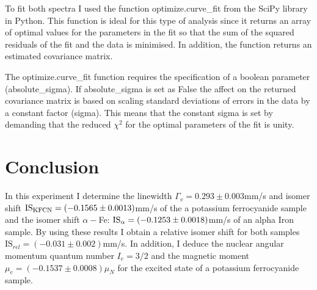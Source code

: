 \documentclass[a4paper, twocolumn]{article}
\begin{document}
To fit both spectra I used the function optimize.curve\_fit from the SciPy library in Python.
This function is ideal for this type of analysis since it returns an array of optimal values for the parameters in the fit so that the sum of the squared residuals of the fit and the data is minimised\cite{15}. In addition, the function returns an estimated covariance matrix.

The optimize.curve\_fit function requires the specification of a boolean parameter (absolute\_sigma). If absolute\_sigma is set as False the affect on the returned covariance matrix is based on scaling standard deviations of errors in the data by a constant factor (sigma). This means that the constant sigma is set by demanding that the reduced $\chi^2$ for the optimal parameters of the fit is unity\cite{15}.

\section{Conclusion}
In this experiment I determine the linewidth $\Gamma_v = 0.293\pm0.003$mm/s and isomer shift $\textrm{IS}_{\rm KFCN} = (-0.1565\pm0.0013)$mm/s of the a potassium ferrocyanide sample and the isomer shift $\alpha-$Fe: $\textrm{IS}_{\rm \alpha} = (-0.1253\pm0.0018)$mm/s of an alpha Iron sample. By using these results I obtain a relative isomer shift for both samples $\textrm{IS}_{rel} = (-0.031\pm0.002)$mm/s.
In addition, I deduce the nuclear angular momentum quantum number $I_e = 3/2$ and the magnetic moment $\mu_e = (-0.1537\pm0.0008)\mu_N$ for the excited state of a potassium ferrocyanide sample.



\end{document}
